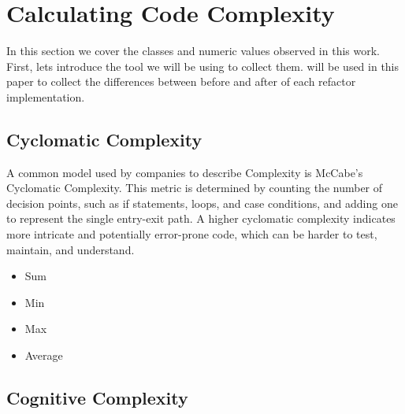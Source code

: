 \section{Calculating Code Complexity}

In this section we cover the classes and numeric values observed in this work.
First, lets introduce the tool we will be using to collect them.
\cite{article:mozilla} will be used in this paper to collect the differences between
before and after of each refactor implementation.

\subsection{Cyclomatic Complexity}

A common model used by companies to describe Complexity is McCabe's Cyclomatic Complexity.
This metric is determined by counting the number of decision points, such as if statements,
loops, and case conditions, and adding one to represent the single entry-exit path.
A higher cyclomatic complexity indicates more intricate and potentially error-prone code,
which can be harder to test, maintain, and understand.

\begin{itemize}
  \item Sum 
  \item Min 
  \item Max 
  \item Average 
\end{itemize}


\subsection{Cognitive Complexity}

